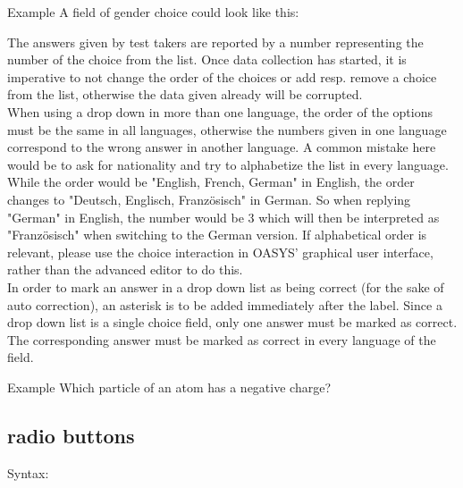 \documentclass[12pt]{article} %
\begin{document}
\begin{exampleBox}{Example}
	A field of gender choice could look like this:\\
	\kw{[@DD WIDTH="150" OPTIONS="female|male|transgender"@]}
\end{exampleBox}

The answers given by test takers are reported by a number representing the number of the choice from the list.
Once data collection has started, it is imperative to not change the order of the choices or add resp.
remove a choice from the list, otherwise the data given already will be corrupted.\\

When using a drop down in more than one language, the order of the options must be the same in all languages, otherwise the numbers given in one language correspond to the wrong answer in another language.
A common mistake here would be to ask for nationality and try to alphabetize the list in every language.
While the order would be "English, French, German" in English, the order changes to "Deutsch, Englisch, Französisch" in German.
So when replying "German" in English, the number would be 3 which will then be interpreted as "Französisch" when switching to the German version.
If alphabetical order is relevant, please use the choice interaction in OASYS' graphical user interface, rather than the advanced editor to do this. \\

In order to mark an answer in a drop down list as being correct (for the sake of auto correction), an asterisk is to be added immediately after the label.
Since a drop down list is a single choice field, only one answer must be marked as correct.
The corresponding answer must be marked as correct in every language of the field.\\

\begin{exampleBox}{Example}
	Which particle of an atom has a negative charge?\\
	\kw{[@DD ID="negativeParticle" WIDTH="150" OPTIONS="electron*|neutron|proton"@]}
\end{exampleBox}

\subsection{radio buttons}\label{subsec:radio-buttons}

Syntax:\hspace{0.5cm}\kw{[@RB ... @]} \\
\end{document}
